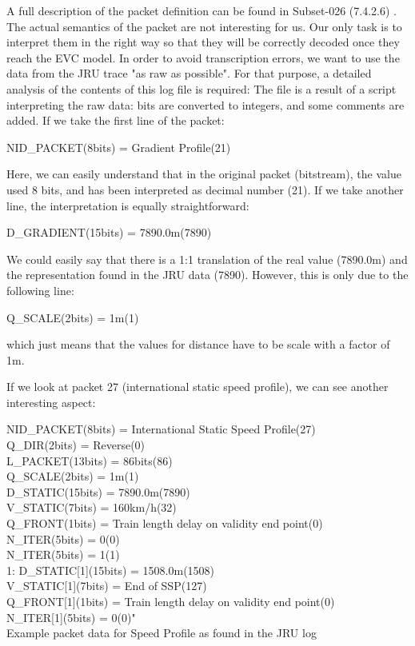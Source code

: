 \documentclass{template/openetcs_article}
\begin{document}
A full description of the packet definition can be found in Subset-026 (7.4.2.6) \cite {SRS026-7}. The actual semantics of the packet are not interesting for us. Our only task is to interpret them in the right way so that they will be correctly decoded once they reach the EVC model.\newline
In order to avoid transcription errors, we want to use the data from the JRU trace "as raw as possible".  For that purpose, a detailed analysis of the contents of this log file is required:
The file is a result of a script interpreting the raw data: bits are converted to integers, and some comments are added.
If we take the first line of the packet:
\begin{table}[H]
  \footnotesize\sffamily
NID\_PACKET(8bits) = Gradient Profile(21)
\end{table}
Here, we can easily understand that in the original packet (bitstream), the value used 8 bits, and has been interpreted as decimal number (21).
If we take another line, the interpretation is equally straightforward:
\begin{table}[H]
  \footnotesize\sffamily
D\_GRADIENT(15bits) = 7890.0m(7890)
\end{table}
We could easily say that there is a 1:1 translation of the real value (7890.0m) and the representation found in the JRU data (7890).
However, this is only due to the following line:
\begin{table}[H]
  \footnotesize\sffamily
Q\_SCALE(2bits) = 1m(1)
\end{table}
which just means that the values for distance have to be scale with a factor of 1m.

If we look at packet 27 (international static speed profile), we can see another interesting aspect:

\begin{table}[H]
  \footnotesize\sffamily
NID\_PACKET(8bits) = International Static Speed Profile(27) \\
Q\_DIR(2bits) = Reverse(0) \\
L\_PACKET(13bits) = 86bits(86) \\
Q\_SCALE(2bits) = 1m(1) \\
D\_STATIC(15bits) = 7890.0m(7890) \\
V\_STATIC(7bits) = 160km/h(32) \\
Q\_FRONT(1bits) = Train length delay on validity end point(0) \\
N\_ITER(5bits) = 0(0) \\
N\_ITER(5bits) = 1(1) \\
    1: D\_STATIC[1](15bits) = 1508.0m(1508) \\
        V\_STATIC[1](7bits) = End of SSP(127) \\
        Q\_FRONT[1](1bits) = Train length delay on validity end point(0) \\
        N\_ITER[1](5bits) = 0(0)" \\
\caption{Example packet data for Speed Profile as found in the JRU log}
  \label{tab:p27}
\end{table}
\end{document}
